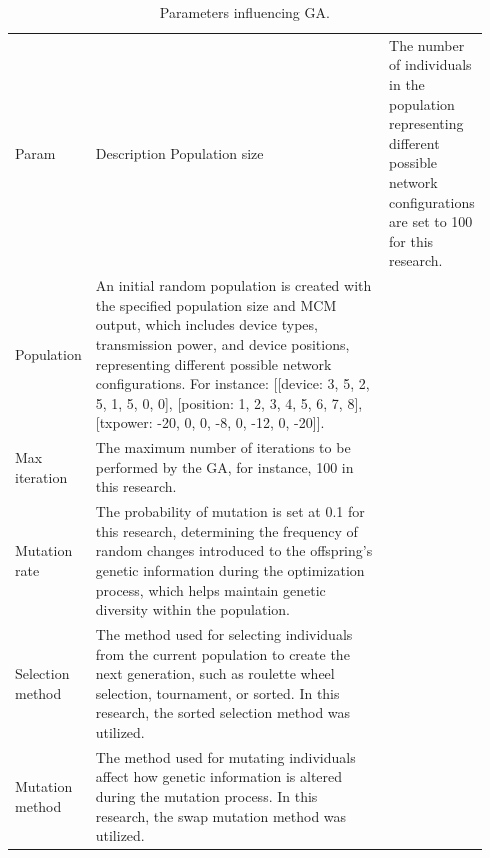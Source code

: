\begin{longtable}{>{\hspace{0pt}}m{0.077\linewidth}>{\hspace{0pt}}m{0.865\linewidth}}
    \label{tab:ga_parameters}\\
    \caption{Parameters influencing \gls{GA}.}\\
    \hline\hline
    Param            & Description \endfirsthead
    \hline
    Population size  & The number of individuals in the population representing different possible network configurations are set to 100 for this research.                                                                                                                                                                                                                             \\
    \hline
    Population       & An initial random population is created with the specified population size and \gls{MCM} output, which includes device types, transmission power, and device positions, representing different possible network configurations. For instance: [[device: 3, 5, 2, 5, 1, 5, 0, 0], [position: 1, 2, 3, 4, 5, 6, 7, 8], [txpower: -20, 0, 0, -8, 0, -12, 0, -20]].  \\
    \hline
    Max iteration    & The maximum number of iterations to be performed by the \gls{GA}, for instance, 100 in this research.                                                                                                                                                                                                                                                            \\
    \hline
    Mutation rate    & The probability of mutation is set at 0.1 for this research, determining the frequency of random changes introduced to the offspring's genetic information during the optimization process, which helps maintain genetic diversity within the population.                                                                                                        \\
    \hline
    Selection method & The method used for selecting individuals from the current population to create the next generation, such as roulette wheel selection, tournament, or sorted. In this research, the sorted selection method was utilized.                                                                                                                                        \\
    \hline
    Mutation method  & The method used for mutating individuals affect how genetic information is altered during the mutation process. In this research, the swap mutation method was utilized.                                                                                                                                                                                         \\
    \hline\hline
\end{longtable}

